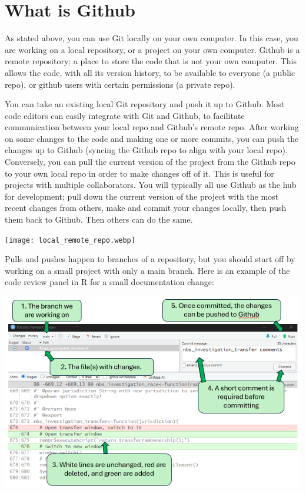 \documentclass[
  letterpaper,
  DIV=11,
  numbers=noendperiod]{scrreprt}
\begin{document}
\hypertarget{what-is-github}{%
\section{What is Github}\label{what-is-github}}

As stated above, you can use Git locally on your own computer. In this
case, you are working on a local repository, or a project on your own
computer. Github is a remote repository; a place to store the code that
is not your own computer. This allows the code, with all its version
history, to be available to everyone (a public repo), or github users
with certain permissions (a private repo).

You can take an existing local Git repository and push it up to Github.
Most code editors can easily integrate with Git and Github, to
facilitate communication between your local repo and Github's remote
repo. After working on some changes to the code and making one or more
commits, you can push the changes up to Github (syncing the Github repo
to align with your local repo). Conversely, you can pull the current
version of the project from the Github repo to your own local repo in
order to make changes off of it. This is useful for projects with
multiple collaborators. You will typically all use Github as the hub for
development; pull down the current version of the project with the most
recent changes from others, make and commit your changes locally, then
push them back to Github. Then others can do the same.

\texttt{[image: local\_remote\_repo.webp]}

Pulls and pushes happen to branches of a repository, but you should
start off by working on a small project with only a main branch. Here is
an example of the code review panel in R for a small documentation
change:

\includegraphics{images/commit_review_R.png}
\end{document}
